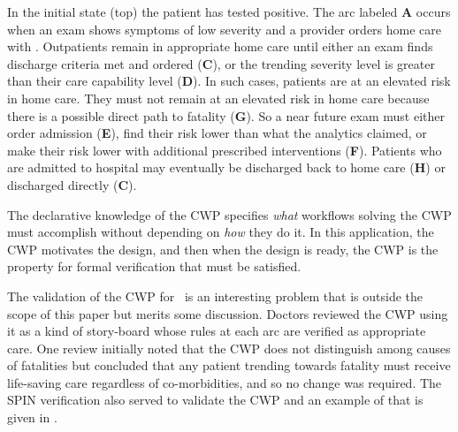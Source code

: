 In the initial state (top) the patient has tested positive.
The arc labeled \textbf{A} occurs when an exam shows symptoms of low severity and a provider orders home care with \phware.
Outpatients remain in appropriate home care until either an exam finds discharge criteria met and ordered (\textbf{C}), or the trending severity level is greater than their care capability level (\textbf{D}).
In such cases, patients are at an elevated risk in home care.
They must not remain at an elevated risk in home care because there is a possible direct path to fatality (\textbf{G}).
So a near future exam must either order admission (\textbf{E}), find their risk lower than what the analytics claimed, or make their risk lower with additional prescribed interventions (\textbf{F}).
Patients who are admitted to hospital may eventually be discharged back to home care (\textbf{H}) or discharged directly (\textbf{C}).

The declarative knowledge of the CWP specifies \emph{what} workflows solving the CWP must accomplish without depending on \emph{how} they do it.
In this application, the CWP motivates the design, and then when the design is ready, the CWP is the property for formal verification that must be satisfied.

The validation of the CWP for \phware\ is an interesting problem that is outside the scope of this paper but merits some discussion.
Doctors reviewed the CWP using it as a kind of story-board whose rules at each arc are verified as appropriate care.
One review initially noted that the CWP does not distinguish among causes of fatalities but concluded that any patient trending towards fatality must receive life-saving care regardless of co-morbidities, and so no change was required.
The SPIN verification also served to validate the CWP and an example of that is given in .

